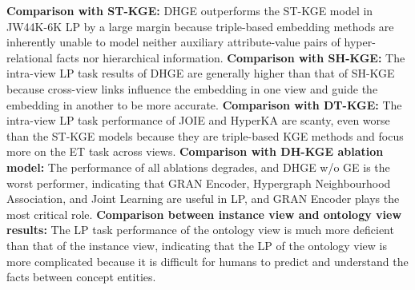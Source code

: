 \documentclass[letterpaper]{article} \usepackage{aaai23}  \usepackage{times}  \usepackage{helvet}  \usepackage{courier}  \usepackage[hyphens]{url}  \usepackage{graphicx} \urlstyle{rm} \def\UrlFont{\rm}  \usepackage{natbib}  \usepackage{caption} \frenchspacing  \setlength{\pdfpagewidth}{8.5in}  \setlength{\pdfpageheight}{11in}  \usepackage{times}
\begin{document}
\textbf{Comparison with ST-KGE:} DHGE outperforms the  ST-KGE model in JW44K-6K LP by a large margin because triple-based embedding methods are inherently unable to model neither auxiliary attribute-value pairs of hyper-relational facts nor hierarchical information.
\textbf{Comparison with SH-KGE:} The intra-view LP task results of DHGE are generally higher than that of SH-KGE because cross-view links influence the embedding in one view and guide the embedding in another to be more accurate.
\textbf{Comparison with DT-KGE:} The intra-view LP task performance of JOIE and HyperKA are scanty, even worse than the ST-KGE models because they are triple-based KGE methods and focus more on the ET task across views.
\textbf{Comparison with DH-KGE ablation model:} The performance of all ablations degrades, and DHGE w/o GE is the worst performer, indicating that GRAN Encoder, Hypergraph Neighbourhood Association, and Joint Learning are useful in LP, and GRAN Encoder plays the most critical role.
\textbf{Comparison between instance view and ontology view results:} The LP task performance of the ontology view is much more deficient than that of the instance view, indicating that the LP of the ontology view is more complicated because it is difficult for humans to predict and understand the facts between concept entities.
\end{document}
